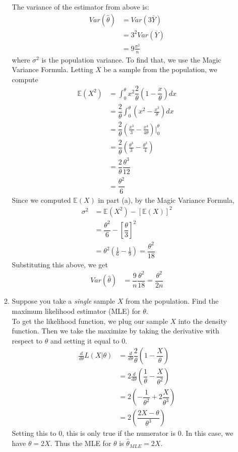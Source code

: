 \documentclass[12pt]{article}
\def\E{{\mathbb E}}
\begin{document}
\begin{enumerate}
\begin{enumerate}
The variance of the estimator from above is:
\begin{align*}
Var( \hat{\theta} ) &=  Var( 3 \bar{Y} )\\
&= 3^2 Var( \bar{Y} )\\
&= 9 \frac{\sigma^2}{n}
\end{align*}
where $\sigma^2$ is the population variance. To find that, we use the Magic Variance Formula. Letting $X$ be a sample from the population, we compute
\begin{align*}
\E(X^2) &= \int_0^\theta x^2 \dfrac{2}{\theta} \left( 1 - \dfrac{x}{\theta} \right) dx \\
&= \dfrac{2}{\theta} \int_0^\theta \left(x^2 - \frac{x^3}{\theta} \right) dx \\
&= \dfrac{2}{\theta} \left(\frac{x^3}{3} - \frac{x^4}{4 \theta} \right)\Bigr|_0^\theta \\
&= \dfrac{2}{\theta} \left(\frac{\theta^3}{3} - \frac{\theta^3}{4} \right) \\
&= \dfrac{2}{\theta} \dfrac{\theta^3}{12} \\
&= \dfrac{\theta^2}{6}
\end{align*}
Since we computed $\E(X)$ in part (a), by the Magic Variance Formula,
\begin{align*}
\sigma^2 &= \E(X^2) - [\E(X)]^2 \\
&= \dfrac{\theta^2}{6} - \left[\dfrac{\theta}{3} \right]^2 \\
&= \theta^2 \left( \frac{1}{6} - \frac{1}{9} \right) = \dfrac{\theta^2}{18}
\end{align*}
Substituting this above, we get
\begin{align*}
Var( \hat{\theta} ) &= \dfrac{9}{n} \dfrac{\theta^2}{18} = \dfrac{\theta^2}{2n}
\end{align*}
\item Suppose you take a \emph{single} sample $X$ from the population. Find the maximum likelihood estimator (MLE) for $\theta$.\\

To get the likelihood function, we plug our sample $X$ into the density function. Then we take the maximize by taking the derivative with respect to $\theta$ and setting it equal to 0.
\begin{align*}
\frac{d}{d\theta} L(X|\theta) &= \frac{d}{d\theta} \dfrac{2}{\theta} \left( 1 - \dfrac{X}{\theta} \right) \\
&= 2 \frac{d}{d\theta} \left( \dfrac{1}{\theta} - \dfrac{X}{\theta^2} \right) \\
&= 2 \left( -\dfrac{1}{\theta^2} + 2 \dfrac{X}{\theta^3} \right) \\
&= 2 \left( \dfrac{2 X - \theta}{\theta^3} \right)
\end{align*}
Setting this to 0, this is only true if the numerator is 0. In this case, we have $\theta = 2 X$. Thus the MLE for $\theta$ is $\hat{\theta}_{MLE} = 2 X$.
\end{enumerate}


\end{enumerate}
\end{document}
